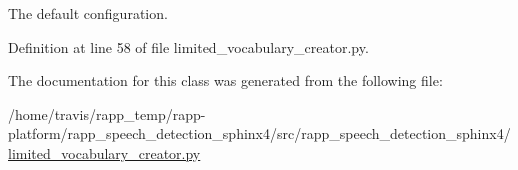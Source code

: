 The default configuration. 



Definition at line 58 of file limited\-\_\-vocabulary\-\_\-creator.\-py.



The documentation for this class was generated from the following file\-:\begin{DoxyCompactItemize}
\item 
/home/travis/rapp\-\_\-temp/rapp-\/platform/rapp\-\_\-speech\-\_\-detection\-\_\-sphinx4/src/rapp\-\_\-speech\-\_\-detection\-\_\-sphinx4/\hyperlink{limited__vocabulary__creator_8py}{limited\-\_\-vocabulary\-\_\-creator.\-py}\end{DoxyCompactItemize}
